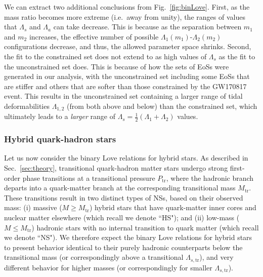\documentclass[prd,twocolumn,nofootinbib,superscriptaddress,amsmath,amssymb]{revtex4-1}
\begin{document}
We can extract two additional conclusions from Fig.~\ref{fig:binLove}. First, as the mass ratio becomes more extreme (i.e.~away from unity), the ranges of values that $\Lambda_s$ and $\Lambda_a$ can take decrease. This is because as the separation between $m_1$ and $m_2$ increases, the effective number of possible $\Lambda_1(m_1)$-$\Lambda_2(m_2)$ configurations decrease, and thus, the allowed parameter space shrinks. Second, the fit to the constrained set does not extend to as high values of $\Lambda_s$ as the fit to the unconstrained set does. This is because of how the sets of EoSs were generated in our analysis, with the unconstrained set including some EoSs that are stiffer and others that are softer than those constrained by the GW170817 event. This results in the unconstrained set  containing a larger range of tidal deformabilities $\Lambda_{1,2}$ (from both above and below) than the constrained set, which ultimately leads to a \emph{larger} range of $\Lambda_s=\frac{1}{2}(\Lambda_1+\Lambda_2)$ values.

\subsubsection{Hybrid quark-hadron stars}

Let us now consider the binary Love relations for hybrid stars. As described in Sec.~\ref{sec:theory}, transitional quark-hadron matter stars undergo strong first-order phase transitions at a transitional pressure $P_{\text{tr}}$, where the hadronic branch departs into a quark-matter branch at the corresponding transitional mass $M_{\text{tr}}$. These transitions result in two distinct types of NSs, based on their observed mass: (i) massive ($M \geq M_{\text{tr}}$) hybrid stars that have quark-matter inner cores and nuclear matter elsewhere (which recall we denote ``HS"); and (ii) low-mass ($M \leq M_{\text{tr}}$) hadronic stars with no internal transition to quark matter (which recall we denote ``NS"). We therefore expect the binary Love relations for hybrid stars to present behavior identical to their purely hadronic counterparts below the transitional mass (or correspondingly above a transitional $\Lambda_{s,\textrm{tr}}$), and very different behavior for higher masses (or correspondingly for smaller $\Lambda_{s,\textrm{tr}}$). 
\end{document}
